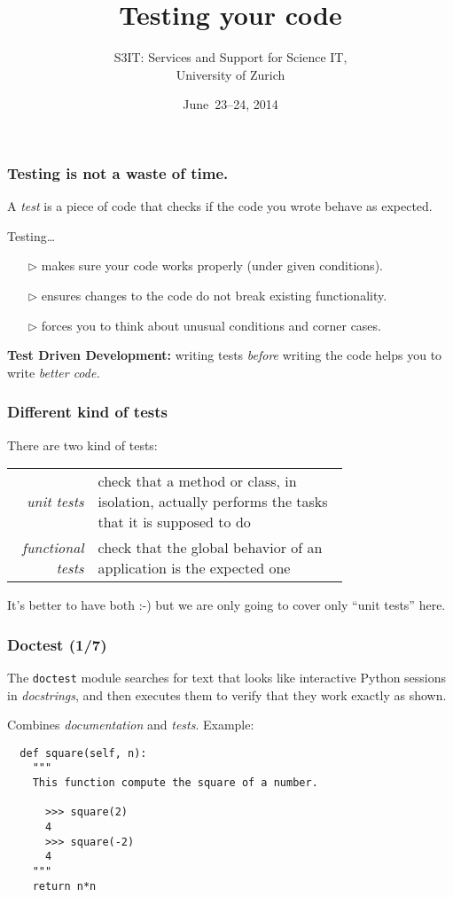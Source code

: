 \documentclass[english,serif,mathserif,xcolor=pdftex,dvipsnames,table]{beamer}
\title[Testing]{%
  Testing your code
}
\author[S3IT]{%
  S3IT: Services and Support for Science IT, \\
  University of Zurich
}
\date{June~23--24, 2014}
\begin{document}
\maketitle


\begin{frame}
  \frametitle{Testing is \textbf{not} a waste of time.}
  A \emph{test} is a piece of code that checks if the code you
  wrote behave as expected.

  \+
  Testing\ldots
  \begin{itemize}
  \item[$\triangleright$] makes sure your code works properly (under given conditions).
  \item[$\triangleright$] ensures changes to the code do not break existing functionality.
  \item[$\triangleright$] forces you to think about unusual conditions and corner cases.
  \end{itemize}

  \+ \textbf{Test Driven Development:} writing tests \textit{before}
  writing the code helps you to write \emph{better code.}
\end{frame}


\begin{frame}
  \frametitle{Different kind of tests}

  There are two kind of tests:

  \+
  \begin{tabular}{>{\em}r>{\raggedright}p{0.75\linewidth}}
    unit tests
    &
    check that a method or class, in isolation,
    actually performs the tasks that it is supposed to do
    \\
    functional tests
    &
    check that the global behavior of an application is the expected one
    \\
  \end{tabular}

  \+
  It's better to have both :-) but we are only going to cover
  only ``unit tests'' here.
\end{frame}


\begin{frame}[fragile]
  \frametitle{Doctest (1/7)}

  The \lstinline|doctest| module searches for text that looks like
  interactive Python sessions in \textit{docstrings}, and then
  executes them to verify that they work exactly as shown.

  \+
  Combines \textit{documentation} and \textit{tests}. Example:
  \begin{lstlisting}
  def square(self, n):
    """
    This function compute the square of a number.

      >>> square(2)
      4
      >>> square(-2)
      4
    """
    return n*n
  \end{lstlisting}
\end{frame}
\end{document}
